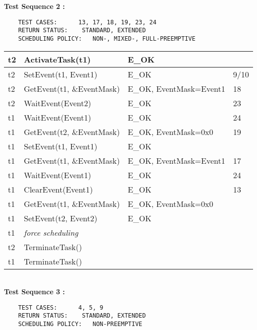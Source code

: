 \documentclass[10pt]{article}
\newlength{\Li}\settowidth{\Li}{Running}
\newlength{\Lii}\setlength{\Lii}{7cm}
\newlength{\Liiii}\setlength{\Liiii}{0.9cm}
\newlength{\Liii}\setlength{\Liii}{\textwidth} \addtolength{\Liii}{-\Li} \addtolength{\Liii}{-\Lii} \addtolength{\Liii}{-\Liiii}
\begin{document}
	\textbf{Test Sequence 2 :}
	\begin{lstlisting}
	TEST CASES:		 13, 17, 18, 19, 23, 24
	RETURN STATUS:	  STANDARD, EXTENDED 
	SCHEDULING POLICY:   NON-, MIXED-, FULL-PREEMPTIVE
	\end{lstlisting}
	

	\begin{supertabular}{|p{\Li}|p{\Lii}|p{\Liii}|p{\Liiii}|} \hline 
	t2 	& ActivateTask(t1) 					& E\_OK					& \\ \hline 
	t2 	& SetEvent(t1, Event1) 				& E\_OK					& 9/10 \\ \hline 
	t2	& GetEvent(t1, \&EventMask) 			& E\_OK, EventMask=Event1	& 18 \\ \hline
	t2 	& WaitEvent(Event2) 				& E\_OK					& 23 \\ \hline
	t1	& WaitEvent(Event1)					& E\_OK					& 24 \\ \hline
	t1 	& GetEvent(t2, \&EventMask) 			& E\_OK, EventMask=0x0		& 19 \\ \hline
	t1 	& SetEvent(t1, Event1)				& E\_OK					&  \\ \hline
	t1 	& GetEvent(t1, \&EventMask)			& E\_OK, EventMask=Event1	& 17 \\ \hline
	t1 	& WaitEvent(Event1) 				& E\_OK 					& 24 \\ \hline
	t1	& ClearEvent(Event1) 				& E\_OK 					& 13 \\ \hline
	t1	& GetEvent(t1, \&EventMask) 			& E\_OK, EventMask=0x0		& \\ \hline
	t1 	& SetEvent(t2, Event2)				& E\_OK					& \\ \hline
	t1 	& \textit{force scheduling}				& 						&\\ \hline
	t2 	& TerminateTask()					& 						& \\ \hline
	t1 	& TerminateTask()					&						&\\ \hline
	\end{supertabular} \\

	\textbf{Test Sequence 3 :}
	\begin{lstlisting}
	TEST CASES:		 4, 5, 9
	RETURN STATUS:	  STANDARD, EXTENDED 
	SCHEDULING POLICY:   NON-PREEMPTIVE
	\end{lstlisting}
	
	
\end{document}
